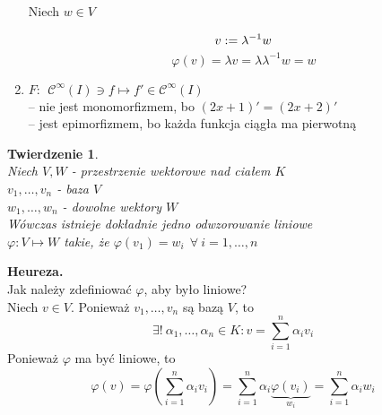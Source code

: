 \documentclass[a5paper,8pt]{article}
\newtheorem{theorem}{Twierdzenie}[section]
\newcommand\tab[1][1cm]{\hspace*{#1}}
\begin{document}
\begin{enumerate}[label=\textbf{\arabic*})]
            Niech $ w \in V $

            \begin{equation*}
                    v := \lambda^{-1} w \\
            \end{equation*}
            \begin{equation*}
                \varphi(v) = \lambda v = \lambda \lambda^{-1} w = w
            \end{equation*}

        \item
            $ F:~~ \mathcal{C}^\infty(I) \ni f \longmapsto f' \in \mathcal{C}^\infty(I) $ \\
            -- nie jest monomorfizmem, bo $ (2x+1)' = (2x+2)' $ \\
            -- jest epimorfizmem, bo każda funkcja ciągła ma pierwotną
    \end{enumerate}

    \newpage
    \begin{theorem} \hfill \\
        Niech $ V, W $ - przestrzenie wektorowe nad ciałem $ K $ \\
        \tab $v_1, \ldots, v_n$ - baza $V$ \\
        \tab $w_1, \ldots, w_n$ - dowolne wektory $W$ \\
        Wówczas istnieje dokładnie jedno odwzorowanie liniowe \\
        \tab $ \varphi : V \longmapsto W $ takie, że $ \varphi(v_1) = w_i ~~ \forall ~i = 1, \ldots, n $
    \end{theorem}

    \large{\textbf{Heureza.}} \\
    Jak należy zdefiniować $ \varphi $, aby było liniowe? \\
    Niech $ v \in V $. Ponieważ $ v_1, \ldots, v_n $ są bazą $ V $, to
    \begin{equation*}
        \exists!~ \alpha_1, \ldots, \alpha_n \in K: v = \sum_{i = 1}^{n} \alpha_i v_i
    \end{equation*}
    Ponieważ $ \varphi $ ma być liniowe, to
    \begin{equation*}
        \varphi(v) = \varphi( \sum_{i = 1}^{n} \alpha_i v_i )
        = \sum_{i = 1}^{n} \alpha_i \underbrace{\varphi(v_i)}_{w_i} = \sum_{i = 1}^{n} \alpha_i w_i
    \end{equation*}
\end{document}
